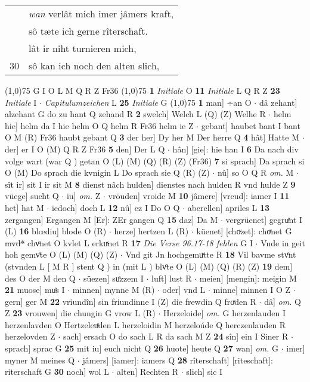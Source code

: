 \documentclass[8pt,a4paper,notitlepage]{article}
\begin{document}
\begin{table}[ht]
\begin{minipage}[t]{0.5\linewidth}
\begin{tabular}{rl}
 & \textit{wan} verlât mich imer jâmers kraft,\\ 
 & sô tæte ich gerne rîterschaft.\\ 
 & lât ir niht turnieren mich,\\ 
30 & sô kan ich noch den alten slich,\\ 
\end{tabular}
\scriptsize
\line(1,0){75} \newline
G I O L M Q R Z Fr36 \newline
\line(1,0){75} \newline
\textbf{1} \textit{Initiale} O  \textbf{11} \textit{Initiale} L Q R Z  \textbf{23} \textit{Initiale} I   $\cdot$ \textit{Capitulumzeichen} L  \textbf{25} \textit{Initiale} G  \newline
\line(1,0){75} \newline
\textbf{1} man] ÷an O  $\cdot$ dâ zehant] alzehant G do zu hant Q zehand R \textbf{2} swelch] Welch L (Q) (Z) Welhe R  $\cdot$ helm hie] helm da I hie helm O Q helm R Fr36 helm ie Z  $\cdot$ gebant] haubet bant I bant O M (R) Fr36 haubt gebant Q \textbf{3} der her] Dy her M Der herre Q \textbf{4} hât] Hatte M  $\cdot$ der] er I O (M) Q R Z Fr36 \textbf{5} den] Der L Q  $\cdot$ hân] [gie]: hie han I \textbf{6} Da nach div volge wart (war Q ) getan O (L) (M) (Q) (R) (Z) (Fr36) \textbf{7} si sprach] Da sprach si O (M) Do sprach die kvnigin L Do sprach sie Q (R) (Z)  $\cdot$ nû] so O Q R \textit{om.} M  $\cdot$ sît ir] sit I ir sit M \textbf{8} dienst nâch hulden] dienstes nach hulden R vnd hulde Z \textbf{9} vüege] sucht Q  $\cdot$ iu] \textit{om.} Z  $\cdot$ vröuden] vroide M \textbf{10} jâmere] [vreud]: iamer I \textbf{11} het] hat M  $\cdot$ iedoch] doch L \textbf{12} nû] ez I Do O Q  $\cdot$ aberellen] apriles L \textbf{13} zergangen] Ergangen M [Er]: ZEr gangen Q \textbf{15} daz] Da M  $\cdot$ vergrüenet] gegruͤnt I (L) \textbf{16} blœdiu] blode O (R)  $\cdot$ herze] hertzen L (R)  $\cdot$ küenet] [choͮzet]: choͮnet G \sout{mvd*} chvͦnet O kvlet L erkuͯnet R \textbf{17} \textit{Die Verse 96.17-18 fehlen} G I   $\cdot$ Vnde in geit hoh gemvͦte O (L) (M) (Q) (Z)  $\cdot$ Vnd git Jn hochgemuͯtte R \textbf{18} Vil bavme stvͦnt (stvnden L [ M R ] stent Q ) in (mit L ) blvͦte O (L) (M) (Q) (R) (Z) \textbf{19} dem] des O der M den Q  $\cdot$ süezen] suͤzzem I  $\cdot$ luft] lust R  $\cdot$ meien] [mengin]: meigin M \textbf{21} muose] muͤs I  $\cdot$ minnen] mynne M (R)  $\cdot$ oder] vnd L  $\cdot$ minne] minnen I O Z  $\cdot$ gern] ger M \textbf{22} vriundîn] sin friundinne I (Z) die frewdin Q froͯden R  $\cdot$ dâ] \textit{om.} Q Z \textbf{23} vrouwen] die chungin G vrow L (R)  $\cdot$ Herzeloide] \textit{om.} G herzenlauden I herzenlavden O Hertzeleuͯden L herzeloidin M herzeloúde Q herczenlauden R herzelovden Z  $\cdot$ sach] ersach O do sach L R da sach M Z \textbf{24} sîn] ein I Siner R  $\cdot$ sprach] sprac G \textbf{25} mit iu] euch nicht Q \textbf{26} huote] heute Q \textbf{27} wan] \textit{om.} G  $\cdot$ imer] myner M meines Q  $\cdot$ jâmers] [iamer]: iamers Q \textbf{28} rîterschaft] [riteschaft]: riterschaft G \textbf{30} noch] wol L  $\cdot$ alten] Rechten R  $\cdot$ slich] sic I \newline

\end{minipage}
\end{table}
\end{document}
